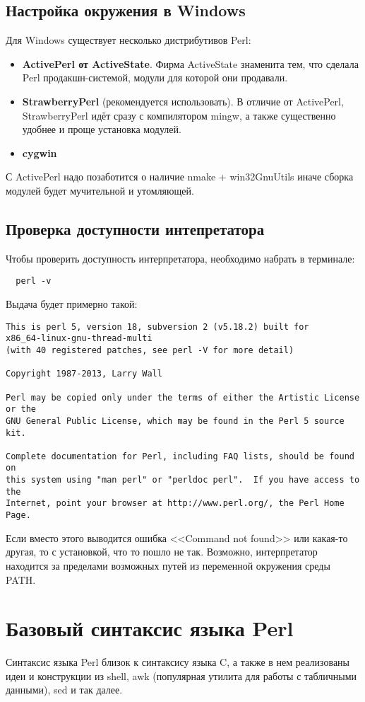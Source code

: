 \subsection{Настройка окружения в Windows}
Для Windows существует несколько дистрибутивов Perl:
\begin{itemize}
  \item \textbf{ActivePerl от ActiveState}. Фирма ActiveState знаменита тем, что сделала Perl продакшн-системой, модули для которой они продавали.
  \item \textbf{StrawberryPerl} (рекомендуется использовать). В отличие от ActivePerl, StrawberryPerl идёт сразу с компилятором mingw, а также существенно удобнее и проще установка модулей.
  \item \textbf{cygwin}
\end{itemize}
С ActivePerl надо позаботится о наличие nmake + win32GnuUtils иначе сборка модулей будет мучительной и утомляющей.


\subsection{Проверка доступности интепретатора}
Чтобы проверить доступность интерпретатора, необходимо набрать в терминале:
\begin{verbatim}
  perl -v
\end{verbatim}
Выдача будет примерно такой:
\begin{verbatim}
This is perl 5, version 18, subversion 2 (v5.18.2) built for
x86_64-linux-gnu-thread-multi
(with 40 registered patches, see perl -V for more detail)

Copyright 1987-2013, Larry Wall

Perl may be copied only under the terms of either the Artistic License or the
GNU General Public License, which may be found in the Perl 5 source kit.

Complete documentation for Perl, including FAQ lists, should be found on
this system using "man perl" or "perldoc perl".  If you have access to the
Internet, point your browser at http://www.perl.org/, the Perl Home Page.
\end{verbatim}

Если вместо этого выводится ошибка <<Command not found>> или какая-то другая, то с установкой, что то пошло не так. Возможно, интерпретатор находится за пределами возможных путей из переменной окружения среды PATH.

\section{Базовый синтаксис языка Perl}
Синтаксис языка Perl близок к синтаксису языка C, а также в нем реализованы идеи и конструкции из shell, awk (популярная утилита для работы с табличными данными), sed и так далее.

